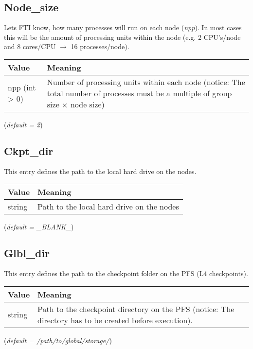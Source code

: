 \documentclass{refrep}
\begin{document}
\subsection{Node\_size}\label{subsec:nodesize}
Lets FTI know, how many processes will run on each node (\emph{npp}). In most cases this will be the amount of processing units within the node (e.g. 2 CPU's/node and 8 cores/CPU $\rightarrow$ 16 processes/node).
\begin{center}
\begin{tabular}[h!]{|p{}|p{}|}
\hline
\textbf{Value} & \textbf{Meaning} \\ \hline
npp (int > 0) & Number of processing units within each node (notice: The total number of processes must be a multiple of group size $\times$ node size) \\ \hline
\end{tabular}
\end{center}
(\textit{default = 2})
\subsection{Ckpt\_dir}\label{subsec:ckptdir}
This entry defines the path to the local hard drive on the nodes.
\begin{center}
\begin{tabular}[h!]{|p{}|p{}|}
\hline
\textbf{Value} & \textbf{Meaning} \\ \hline
string & Path to the local hard drive on the nodes \\ \hline
\end{tabular}
\end{center}
(\textit{default = \_BLANK\_})
\subsection{Glbl\_dir}\label{subsec:glbldir}
This entry defines the path to the checkpoint folder on the PFS (L4 checkpoints).
\begin{center}
\begin{tabular}[h!]{|p{}|p{}|}
\hline
\textbf{Value} & \textbf{Meaning} \\ \hline
string & Path to the checkpoint directory on the PFS (notice: The directory has to be created before execution). \\ \hline
\end{tabular}
\end{center}
(\textit{default = /path/to/global/storage/})
\end{document}
